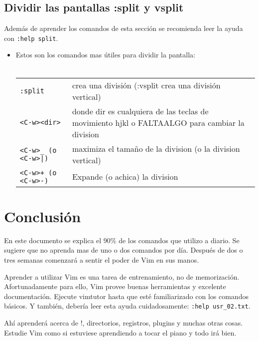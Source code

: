 \subsection{Dividir las pantallas :split y vsplit}

Además de aprender los comandos de esta sección se recomienda leer la ayuda con \texttt{:help split}.

\begin{itemize}
	\item Estos son los comandos mas útiles para dividir la pantalla: \\ \\
\begin{tabular}{ l l }
	\texttt{:split} & crea una división (:vsplit crea una división vertical) \\
	\texttt{<C-w><dir>} & donde dir es cualquiera de las teclas de movimiento hjkl o FALTAALGO para cambiar la division \\
	\texttt{<C-w>\_ (o <C-w>|)} & maximiza el tamaño de la division (o la division vertical) \\
	\texttt{<C-w>+ (o <C-w>-)} & Expande (o achica) la division \\
\end{tabular}
\end{itemize}



\section{Conclusión}

En este documento se explica el 90\% de los comandos que utilizo a diario. Se sugiere que no aprenda mas de uno o dos comandos por día. Después de dos o tres semanas comenzará a sentir el poder de Vim en sus manos.

Aprender a utilizar Vim es una tarea de entrenamiento, no de memorización. Afortunadamente para ello, Vim 
provee buenas herramientas y excelente documentación. Ejecute vimtutor hasta que esté familiarizado con los comandos básicos. Y también, debería leer esta ayuda cuidadosamente:  \texttt{:help usr\_02.txt}.

Ahí aprenderá acerca de !, directorios, registros, plugins y muchas otras cosas. Estudie Vim como si estuviese aprendiendo a tocar el piano y todo irá bien.




